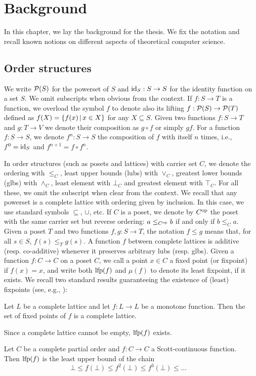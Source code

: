 
\chapter{Background}\label{ch:background}

In this chapter, we lay the background for the thesis. We fix the notation and recall known notions on different aspects of theoretical computer science.

\section{Order structures}
We write $\mathcal{P}(S)$ for the powerset of $S$ and $\text{id}_S: S \rightarrow S$ for the identity function on a set $S$. We omit subscripts when obvious from the context. If $f : S \rightarrow T$ is a function, we overload the symbol $f$ to denote also its lifting $f: \mathcal{P}(S) \rightarrow \mathcal{P}(T)$ defined as $f(X) = \{ f(x) \,\vert\, x \in X \}$ for any $X \subseteq S$.
Given two functions $f: S \rightarrow T$ and $g: T \rightarrow V$ we denote their composition as $g \circ f$ or simply $gf$.
For a function $f : S \rightarrow S$, we denote $f^n: S \rightarrow S$ the composition of $f$ with itself $n$ times, i.e., $f^{0} = \text{id}_S$ and $f^{n+1} = f \circ f^{n}$.

In order structures (such as posets and lattices) with carrier set $C$, we denote the ordering with $\le_C$, least upper bounds (lubs) with $\vee_C$, greatest lower bounds (glbs) with $\wedge_C$, least element with $\bot_C$ and greatest element with $\top_C$. For all these, we omit the subscript when clear from the context.
We recall that any powerset is a complete lattice with ordering given by inclusion. In this case, we use standard symbols $\subseteq$, $\cup$, etc.
If $C$ is a poset, we denote by $C^{\text{op}}$ the poset with the same carrier set but reverse ordering: $a \le_{C^{\text{op}}} b$ if and only if $b \le_C a$.
Given a poset $T$ and two functions $f, g: S \rightarrow T$, the notation $f \le g$ means that, for all $s \in S$, $f(s) \le_T g(s)$.
A function $f$ between complete lattices is additive (resp. co-additive) whenever it preserves arbitrary lubs (resp. glbs).
Given a function $f : C \rightarrow C$ on a poset $C$, we call a point $x \in C$ a fixed point (or fixpoint) if $f(x) = x$, and write both $\text{lfp}(f)$ and $\mu(f)$ to denote its least fixpoint, if it exists. We recall two standard results guaranteeing the existence of (least) fixpoints (see, e.g., \cite{DP02}):
\begin{theorem}
	Let $L$ be a complete lattice and let $f: L \rightarrow L$ be a monotone function. Then the set of fixed points of $f$ is a complete lattice.
\end{theorem}
\begin{corollary}
	Since a complete lattice cannot be empty, $\text{lfp}(f)$ exists.
\end{corollary}
\begin{theorem}[Kleene]
	Let $C$ be a complete partial order and $f : C \rightarrow C$ a Scott-continuous function. Then $\text{lfp}(f)$ is the least upper bound of the chain
	\[
	\bot \le f(\bot) \le f^2(\bot) \le f^3(\bot) \le \dots
	\]
\end{theorem}

